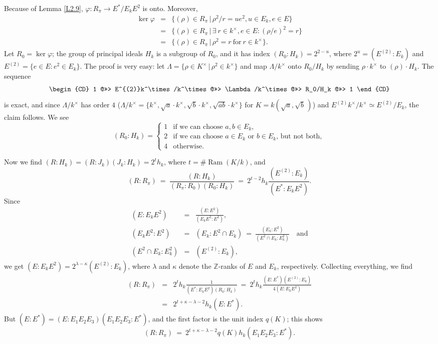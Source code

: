 \documentclass{amsart}
\newcommand{\Z}{\mathbb Z}
\newcommand{\sth}{\,|\,}
\newcommand{\lra}{\longrightarrow}
\newcommand{\Ram}{{\operatorname{Ram}}}
\begin{document}
Because of Lemma \ref{L2.9}, $\varphi: R_\pi \lra E^*/E_kE^2$
is onto. Moreover,
\begin{eqnarray*}
  \ker \varphi & = & \{ (\rho) \in R_\pi \sth
           \rho^2/r = ue^2, u \in E_k, e \in E\} \\
         & = & \{ (\rho) \in R_\pi \sth
           \exists\ r \in k^\times, e \in E: (\rho/e)^2 = r\} \\
         & = & \{ (\rho) \in R_\pi \sth
           \rho^2 = r\ \text{for}\ r \in k^\times \}.
\end{eqnarray*}
Let $R_0 = \ker \varphi$; the group of principal ideals $H_k$ is a
subgroup of $R_0$, and it has index $(R_0:H_k) = 2^{2-u}$, where
$2^u = (E^{(2)}:E_k)$ and $E^{(2)} = \{e \in E: e^2 \in E_k\}$.
The proof is very easy: let $\Lambda = \{\rho \in K^\times \sth
\rho^2 \in k^\times\}$ and map $\Lambda/k^\times$ onto $R_0/H_k$
by sending $\rho\cdot k^\times$ to $(\rho)\cdot H_k$. The sequence
$$ \begin{CD}
   1 @>>> E^{(2)}k^\times/k^\times @>>> \Lambda/k^\times
     @>>> R_0/H_k @>>> 1 \end{CD} $$
is exact, and since $\Lambda/k^\times$ has order $4$
($\Lambda/k^\times = \{k^\times, \sqrt{a} \cdot k^\times,
 \sqrt{b}\cdot k^\times, \sqrt{ab} \cdot k^\times \}$ for
$K = k(\sqrt{a}, \sqrt{b}\,)$) and
$E^{(2)} k^\times/k^\times \simeq E^{(2)}/E_k$, the claim
follows. We see
$$ (R_0 : H_k) = \begin{cases}
   1 & \text{if we can choose $a, b \in E_k$}, \\
   2 & \text{if we can choose $a \in E_k$ or $b \in E_k$,
             but not both}, \\
   4 & \text{otherwise}. \end{cases} $$

Now we find $(R : H_k) = (R:J_k)(J_k:H_k) = 2^t h_k$,
where $t = \# \Ram(K/k)$, and
$$ (R:R_\pi) \ = \ \frac{(R:H_k)}{(R_\pi:R_0)(R_0:H_k)}
      \ = \ 2^{t-2} h_k \frac{(E^{(2)}:E_k)}{(E^*:E_kE^2)}. $$
Since
\begin{eqnarray*}
  (E:E_kE^2)   & = & \frac{(E:E^2)}{(E_kE^2:E^2)}, \\
  (E_kE^2:E^2) & = & (E_k:E^2\cap E_k) \ = \
        \frac{(E_k:E^2)}{(E^2 \cap E_k : E_k^2)} \quad \text{and} \\
  (E^2 \cap E_k : E_k^2) & = & (E^{(2)} : E_k),
\end{eqnarray*}
we get $(E:E_kE^2) = 2^{\lambda-\kappa} (E^{(2)}:E_k)$, where
$\lambda$ and $\kappa$ denote the $\Z$-ranks of $E$ and $E_k$,
respectively. Collecting everything, we find
\begin{eqnarray*}
  (R:R_\pi) & = & 2^t h_k \frac1{(E^*:E_kE^2)(R_0:H_k)}
    \ = \ 2^t h_k \frac{(E:E^*)(E^{(2)}:E_k)}{4(E:E_kE^2)} \\
    & = & 2^{t+\kappa-\lambda-2} h_k (E:E^*).
\end{eqnarray*}
But $(E:E^*) = (E:E_1E_2E_3)(E_1E_2E_3:E^*)$, and the first
factor is the unit index $q(K)$; this shows
\begin{equation}\label{E2.10}
  (R:R_\pi) \ = \ 2^{t+\kappa-\lambda-2} q(K) h_k (E_1E_2E_3:E^*).
\end{equation}
\end{document}
